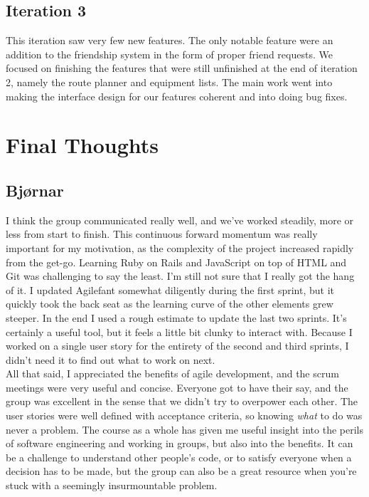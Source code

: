 \documentclass[a4paper]{article}
\begin{document}
\subsection{Iteration 3}
This iteration saw very few new features. The only notable feature were an addition to the friendship system in the form of proper friend requests. We focused on finishing the features that were still unfinished at the end of iteration 2, namely the route planner and equipment lists. The main work went into making the interface design for our features coherent and into doing bug fixes.


\section{Final Thoughts}

\subsection{Bjørnar}
I think the group communicated really well, and we've worked steadily, more or less from start to finish. This continuous forward momentum was really important for my motivation, as the complexity of the project increased rapidly from the get-go. Learning Ruby on Rails and JavaScript on top of HTML and Git was challenging to say the least. I'm still not sure that I really got the hang of it. I updated Agilefant somewhat diligently during the first sprint, but it quickly took the back seat as the learning curve of the other elements grew steeper. In the end I used a rough estimate to update the last two sprints. It's certainly a useful tool, but it feels a little bit clunky to interact with. Because I worked on a single user story for the entirety of the second and third sprints, I didn't need it to find out what to work on next.\\

\noindent
All that said, I appreciated the benefits of agile development, and the scrum meetings were very useful and concise. Everyone got to have their say, and the group was excellent in the sense that we didn't try to overpower each other. The user stories were well defined with acceptance criteria, so knowing \textit{what} to do was never a problem. The course as a whole has given me useful insight into the perils of software engineering and working in groups, but also into the benefits. It can be a challenge to understand other people's code, or to satisfy everyone when a decision has to be made, but the group can also be a great resource when you're stuck with a seemingly insurmountable problem.
\end{document}
